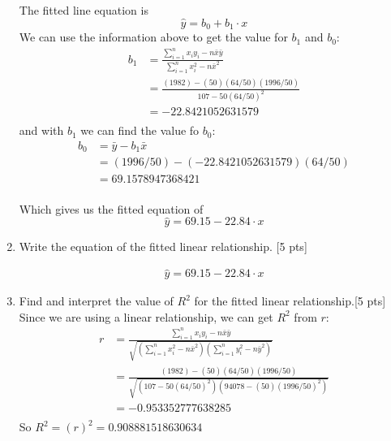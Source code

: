 \documentclass[11pt]{article}\usepackage[]{graphicx}\usepackage[]{color}
\begin{document}
\begin{enumerate}
      The fitted line equation is 
      $$
      \hat{y} = b_0 + b_1 \cdot x
      $$
      We can use the information above to get the value for $b_1$ and $b_0$:
      \begin{align*}
         b_1 &= \frac{ \sum_{i = 1}^n x_i y_i - n \bar{x} \bar{y} }{ \sum_{i = 1}^n x_i^2 - n \bar{x}^2 } \\
             &= \frac{ (1982) - (50) (64/50) (1996/50) }{ 107 - 50  (64/50)^2 } \\
             &= -22.8421052631579 \\
      \end{align*} 
      and with $b_1$ we can find the value fo $b_0$: 
      \begin{align*}
         b_0 &= \bar{y} - b_1 \bar{x} \\
             &= (1996/50) - (-22.8421052631579) (64/50) \\
             &= 69.1578947368421 \\
      \end{align*} 

      Which gives us the fitted equation of
      $$
      \hat{y} = 69.15 -22.84 \cdot x
      $$


      \item Write the equation of the fitted linear relationship. [5 pts] 

          \begin{align*}
          \hat{y} = 69.15 -22.84 \cdot x
          \end{align*}

      \item Find and interpret the value of $R^2$ for the fitted linear relationship.[5 pts]\\

            Since we are using a linear relationship, we can get $R^2$ from $r$:
            \begin{align*} 
            r &= \frac{\sum_{i=1}^n x_i y_i - n \bar{x} \bar{y}}{\sqrt{\left(\sum_{i=1}^n x_i^2 - n \bar{x}^2\right)\left(\sum_{i=1}^n y_i^2 - n\bar{y}^2\right)}} \\
              &= \frac{(1982) - (50) (64/50) (1996/50) }{\sqrt{\left(107 - 50 (64/50)^2 \right)\left(94078 - (50)(1996/50)^2\right)}} \\
              &= -0.953352777638285 \\
            \end{align*} 
            So $R^2 = (r)^2 = 0.908881518630634$\\
            

\end{enumerate}
\end{document}
